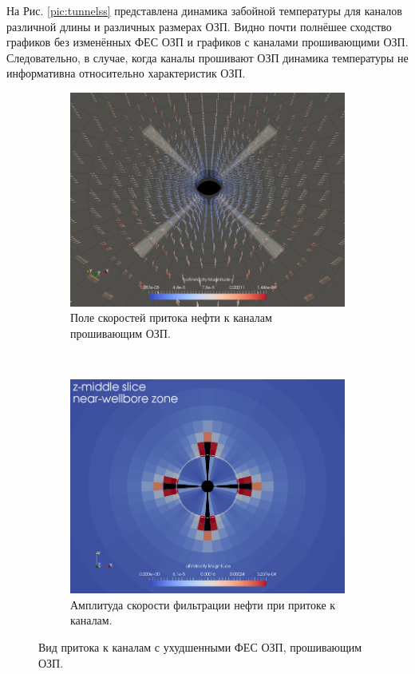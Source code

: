 	На Рис. \ref{pic:tunnelss} представлена динамика забойной температуры для каналов различной длины и различных размерах ОЗП.
	Видно почти полнёшее сходство графиков без изменённых ФЕС ОЗП и графиков с каналами прошивающими ОЗП. 
	Следовательно, в случае, когда каналы прошивают ОЗП динамика температуры не информативна относительно характеристик ОЗП.
	

\begin{figure}[H]
	\begin{subfigure}[b]{0.5\textwidth}
	\centering
	\includegraphics[width=1\textwidth]{pic/tunnels-top1.png}
	\caption{Поле скоростей притока нефти к каналам прошивающим ОЗП.}
	\label{pic:tunnels-top1}
	\end{subfigure}
~
	\begin{subfigure}[b]{0.5\textwidth}
		\centering
		\includegraphics[width=1\textwidth]{pic/tunnels-fes.png}
		\caption{Амплитуда скорости фильтрации нефти при притоке к каналам.}
		\label{pic:tunnels-fes}
	\end{subfigure}

	\caption{Вид притока к каналам с ухудшенными ФЕС ОЗП, прошивающим ОЗП.}
	\label{pic:tun_fes}
\end{figure}

